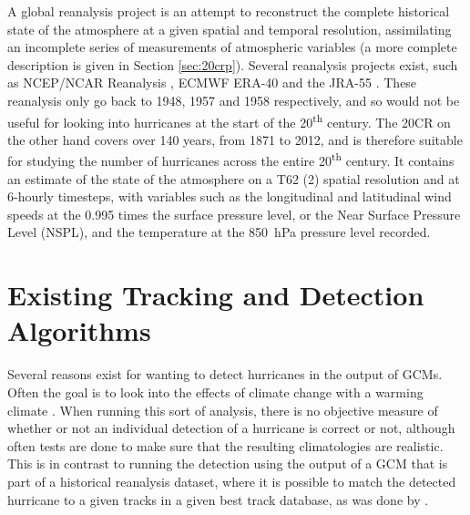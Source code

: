 \documentclass[pdftex,12pt,a4paper]{report}
\newcommand{\ts}{\textsuperscript}
\begin{document}

A global reanalysis project is an attempt to reconstruct the complete historical state of the
atmosphere at a given spatial and temporal resolution, assimilating an incomplete series of
measurements of atmospheric variables (a more complete description is given in Section
\ref{sec:20crp}). %
Several reanalysis projects exist, such as NCEP/NCAR Reanalysis \parencite{kalnay1996ncep,
kistler2001ncep}, ECMWF ERA-40 \parencite{uppala2005era} and the JRA-55
\parencite{ebita2011japanese}.  These reanalysis only go back to 1948, 1957 and 1958  respectively,
and so would not be useful for looking into hurricanes at the start of the 20\ts{th} century. The
20CR on the other hand covers over 140 years, from 1871 to 2012, and is therefore suitable for
studying the number of hurricanes across the entire 20\ts{th} century.  It contains an estimate of
the state of the atmosphere on a T62 (2\textdegree) spatial resolution and at 6-hourly timesteps,
with variables such as the longitudinal and latitudinal wind speeds at the 0.995 times the surface
pressure level, or the Near Surface Pressure Level (NSPL), and the temperature at the \SI{850}{hPa}
pressure level recorded.

\section{Existing Tracking and Detection Algorithms}


Several reasons exist for wanting to detect hurricanes in the output of GCMs. Often the goal is to
look into the effects of climate change with a warming climate \parencite{bengtsson1996will,
sugi2002influence, yoshimura2006influence}. When running this sort of analysis, there is no objective measure of whether or not
an individual detection of a hurricane is correct or not, although often tests are done to make sure
that the resulting climatologies are realistic. This is in contrast to running the detection using
the output of a GCM that is part of a historical reanalysis dataset, where it is possible to match
the detected hurricane to a given tracks in a given best track database, as was done by
\textcite{walsh1997objective}.
\end{document}
